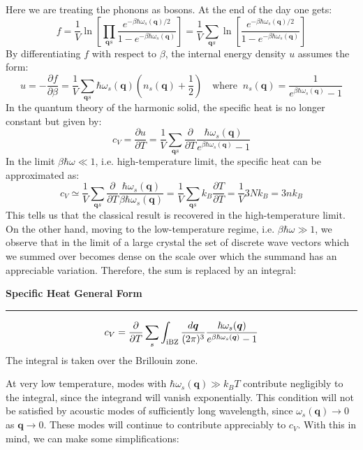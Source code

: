 \documentclass[10.75pt,a4paper,openright,bottom=2cm]{article}
\renewcommand{\Vec}[1]{\boldsymbol{#1}}
\newcommand{\RN}[1]{%
  \textup{\uppercase\expandafter{\romannumeral#1}}%
}
\begin{document}
Here we are treating the phonons as bosons. At the end of the day one gets:
\[
f=\frac{1}{V}\ln{\left[\prod_{\Vec{q}s}\frac{e^{-\beta\hbar\omega_s(\Vec{q})/2}}{1-e^{-\beta\hbar\omega_s(\Vec{q})}}\right]}=\frac{1}{V}\sum_{\Vec{q}s}\ln{\left[\frac{e^{-\beta\hbar\omega_s(\Vec{q})/2}}{1-e^{-\beta\hbar\omega_s(\Vec{q})}}\right]}
\]
By differentiating $f$ with respect to $\beta$, the internal energy density $u$ assumes the form:
\[
u=-\frac{\partial f}{\partial\beta}=\frac{1}{V}\sum_{\Vec{q}s}\hbar\omega_s(\Vec{q})\left(n_s(\Vec{q})+\frac{1}{2}\right) \quad \text{where}\;\; n_s(\Vec{q})=\frac{1}{e^{\beta\hbar\omega_s(\Vec{q})}-1}
\]
In the quantum theory of the harmonic solid, the specific heat is no longer constant but given by:
\[
c_V=\frac{\partial u}{\partial T}=\frac{1}{V}\sum_{\Vec{q}s}\frac{\partial}{\partial T}\frac{\hbar\omega_s(\Vec{q})}{e^{\beta\hbar\omega_s(\Vec{q})}-1}
\]
In the limit $\beta\hbar\omega\ll1$, i.e. high-temperature limit, the specific heat can be approximated as:
\[
c_V\simeq\frac{1}{V}\sum_{\Vec{q}s}\frac{\partial}{\partial T}\frac{\hbar\omega_s(\Vec{q})}{\beta\hbar\omega_s(\Vec{q})}=\frac{1}{V}\sum_{\Vec{q}s}k_B\frac{\partial T}{\partial T}=\frac{1}{V}3Nk_B=3nk_B
\]
This tells us that the classical result is recovered in the high-temperature limit.\\
On the other hand, moving to the low-temperature regime, i.e. $\beta\hbar\omega\gg1$, we observe that in the limit of a large crystal the set of discrete wave vectors which we summed over becomes dense on the scale over which the summand has an appreciable variation. Therefore, the sum is replaced by an integral:
\begin{mybox}
\textbf{Specific Heat General Form{\color{blue!30}{g}}}
\hrule
\vspace{0.2cm}
\begin{equation}
\label{general}
c_V=\frac{\partial}{\partial T}\sum_s\int_{\text{\RN{1}BZ}}\frac{d\Vec{q}}{(2\pi)^3}\frac{\hbar\omega_s(\Vec{q})}{e^{\beta\hbar\omega_s(\Vec{q})}-1}
\end{equation}
The integral is taken over the  Brillouin zone.
\end{mybox}\noindent
At very low temperature, modes with $\hbar\omega_s(\Vec{q})\gg k_BT$ contribute negligibly to the integral, since the integrand will vanish exponentially. This condition will not be satisfied by acoustic modes of sufficiently long wavelength, since $\omega_s(\Vec{q})\to0$ as $\Vec{q}\to0$. These modes will continue to contribute appreciably to $c_V$. With this in mind, we can make some simplifications:
\end{document}
